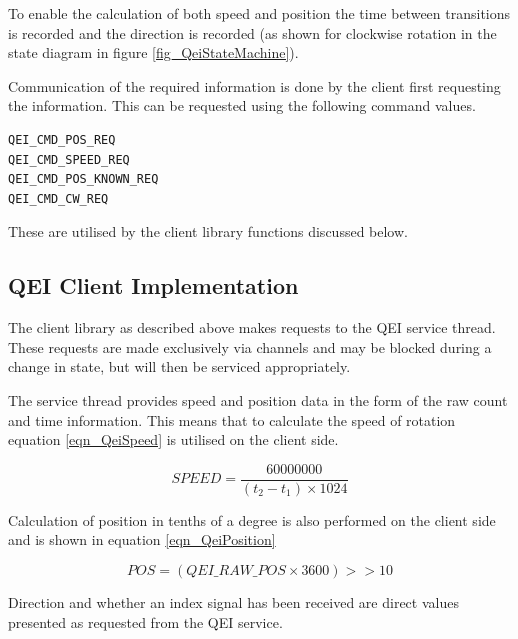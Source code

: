 To enable the calculation of both speed and position the time between transitions is recorded and the direction is recorded (as shown for clockwise rotation in the state diagram in figure \ref{fig_QeiStateMachine}).

Communication of the required information is done by the client first requesting the information. This can be requested using the following command values.

\begin{lstlisting}
QEI_CMD_POS_REQ
QEI_CMD_SPEED_REQ
QEI_CMD_POS_KNOWN_REQ
QEI_CMD_CW_REQ
\end{lstlisting}

These are utilised by the client library functions discussed below.

\subsection{QEI Client Implementation}
The client library as described above makes requests to the QEI service thread. These requests are made exclusively via channels and may be blocked during a change in state, but will then be serviced appropriately.

The service thread provides speed and position data in the form of the raw count and time information. This means that to calculate the speed of rotation equation \ref{eqn_QeiSpeed} is utilised on the client side.

\begin{equation}\label{eqn_QeiSpeed}
SPEED =  \frac{60000000}{(t_2 - t_1) \times 1024}
\end{equation}

Calculation of position in tenths of a degree is also performed on the client side and is shown in equation \ref{eqn_QeiPosition}

\begin{equation}\label{eqn_QeiPosition}
POS = (QEI\_RAW\_POS \times 3600) >> 10 
\end{equation}

Direction and whether an index signal has been received are direct values presented as requested from the QEI service.
